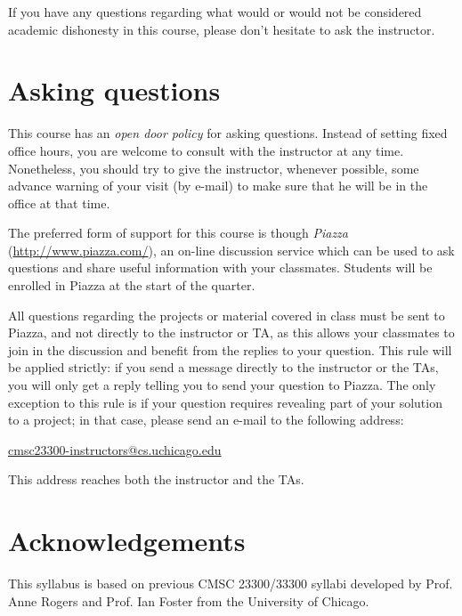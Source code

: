\documentclass[11pt]{article}
\begin{document}
If you have any questions regarding what would or would not be considered academic dishonesty in this course, please don't hesitate to ask the instructor.


\section{Asking questions}
\label{asking}

This course has an \emph{open door policy} for asking questions. Instead of setting fixed office hours, you are welcome to consult with the instructor at any time. Nonetheless, you should try to give the instructor, whenever possible, some advance warning of your visit (by e-mail) to make sure that he will be in the office at that time.

The preferred form of support for this course is though \emph{Piazza} (\url{http://www.piazza.com/}), an on-line discussion service which can be used to ask questions and share useful information with your classmates. Students will be enrolled in Piazza at the start of the quarter.

All questions regarding the projects or material covered in class must be sent to Piazza, and not directly to the instructor or TA, as this allows your classmates to join in the discussion and benefit from the replies to your question. This rule will be applied strictly: if you send a message directly to the instructor or the TAs, you will only get a reply telling you to send your question to Piazza. The only exception to this rule is if your question requires revealing part of your solution to a project; in that case, please send an e-mail to the following address:

\begin{center}
\url{cmsc23300-instructors@cs.uchicago.edu}
\end{center}

This address reaches both the instructor and the TAs.


\section{Acknowledgements}

This syllabus is based on previous CMSC 23300/33300 syllabi developed by Prof. Anne Rogers and Prof. Ian Foster from the University of Chicago.
\end{document}
